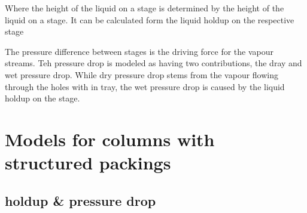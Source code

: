     Where the height of the liquid on a stage is determined by the height of the liquid on a
    stage. It can be calculated form the liquid holdup on the respective stage 
    
    The pressure difference between stages is the driving force for the vapour streams. Teh pressure drop 
    is modeled as having two contributions, the dray and wet pressure drop. While dry pressure drop
    stems from the vapour flowing through the holes with in tray, the wet pressure drop is caused by the liquid 
    holdup on the stage. 
    

\section{Models for columns with structured packings}

    \subsection{holdup \& pressure drop}
